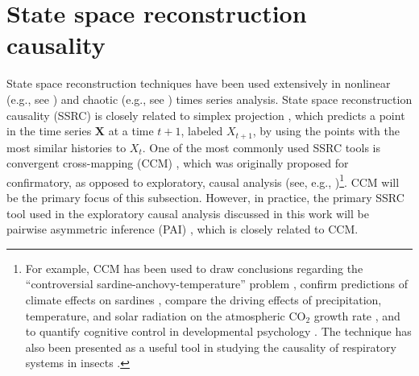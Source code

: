 \section{State space reconstruction causality}
\label{sec:SSRC}
State space reconstruction techniques have been used extensively in nonlinear (e.g., see \cite{Deyle2011}) and chaotic (e.g., see \cite{Farmer1987}) times series analysis.  State space reconstruction causality (SSRC) is closely related to simplex projection \cite{Sugihara1990,Sugihara1990a}, which predicts a point in the time series $\mathbf{X}$ at a time $t+1$, labeled $X_{t+1}$, by using the points with the most similar histories to $X_t$.  One of the most commonly used SSRC tools is convergent cross-mapping (CCM) \cite{Sugihara2012}, which was originally proposed for confirmatory, as opposed to exploratory, causal analysis (see, e.g., \cite{Ye2014,Sugihara2012})\footnote{For example, CCM has been used to draw conclusions regarding the ``controversial sardine-anchovy-temperature'' problem \cite{Sugihara2012}, confirm predictions of climate effects on sardines \cite{Deyle2013}, compare the driving effects of precipitation, temperature, and solar radiation on the atmospheric CO$_2$ growth rate \cite{Wang2014}, and to quantify cognitive control in developmental psychology \cite{Anastas2013}.  The technique has also been presented as a useful tool in studying the causality of respiratory systems in insects \cite{Bozorgmagham2013}.}.  CCM will be the primary focus of this subsection.  However, in practice, the primary SSRC tool used in the exploratory causal analysis discussed in this work will be pairwise asymmetric inference (PAI) \cite{Weigel2014}, which is closely related to CCM.  

